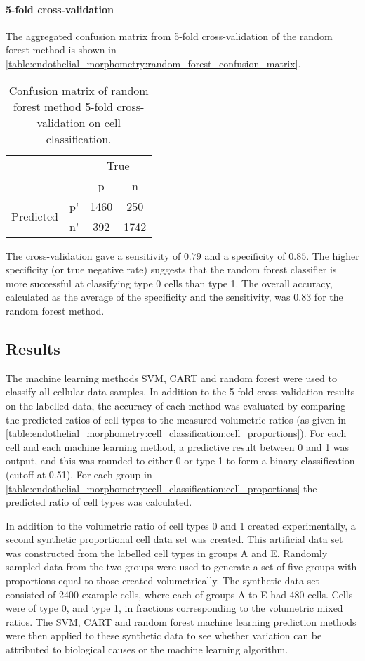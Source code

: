 \paragraph{5-fold cross-validation}
The aggregated confusion matrix from 5-fold cross-validation of the random forest method is shown in \autoref{table:endothelial_morphometry:random_forest_confusion_matrix}.
\begin{table}[htbp!]
\caption[Confusion matrix of random forest cross-validation on cell classification]{Confusion matrix of random forest method 5-fold cross-validation on cell classification.}
\label{table:endothelial_morphometry:random_forest_confusion_matrix}
\centering
\begin{tabular}{cc|cc}
	\multicolumn{2}{c}{}&\multicolumn{2}{c}{True}\\
	\multicolumn{2}{c|}{}& p & n\\
	\cline{2-4}
	\multirow{2}{*}{Predicted}& p' & 1460 & 250\\ & n' & 392 & 1742\\
\end{tabular}
\end{table}

The cross-validation gave a sensitivity of $0.79$ and a specificity of $0.85$. The higher specificity (or true negative rate) suggests that the random forest classifier is more successful at classifying type 0 cells than type 1. The overall accuracy, calculated as the average of the specificity and the sensitivity, was $0.83$ for the random forest method.

\subsection{Results}
The machine learning methods SVM, CART and random forest were used to classify all cellular data samples. In addition to the 5-fold cross-validation results on the labelled data, the accuracy of each method was evaluated by comparing the predicted ratios of cell types to the measured volumetric ratios (as given in \autoref{table:endothelial_morphometry:cell_classification:cell_proportions}). For each cell and each machine learning method, a predictive result between 0 and 1 was output, and this was rounded to either 0 or type 1 to form a binary classification (cutoff at 0.51). For each group in \autoref{table:endothelial_morphometry:cell_classification:cell_proportions} the predicted ratio of cell types was calculated.

In addition to the volumetric ratio of cell types 0 and 1 created experimentally, a second synthetic proportional cell data set was created. This artificial data set was constructed from the labelled cell types in groups A and E. Randomly sampled data from the two groups were used to generate a set of five groups with proportions equal to those created volumetrically. The synthetic data set consisted of 2400 example cells, where each of groups A to E had 480 cells. Cells were of type 0, and type 1, in fractions corresponding to the volumetric mixed ratios. The SVM, CART and random forest machine learning prediction methods were then applied to these synthetic data to see whether variation can be attributed to biological causes or the machine learning algorithm.

